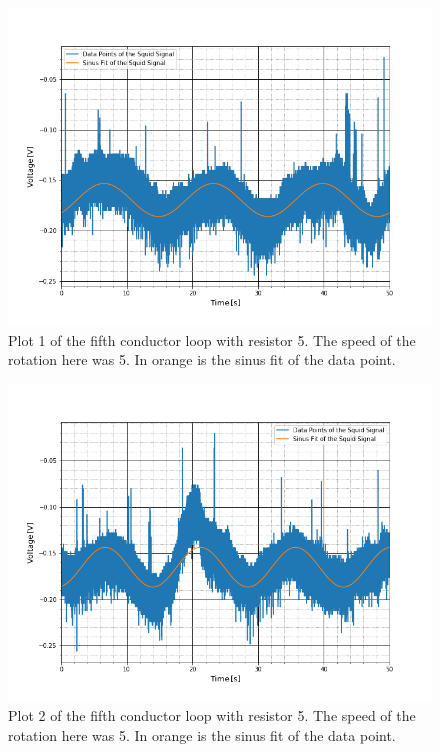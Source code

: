 \begin{figure}[ht]
	\includegraphics[scale=0.5]{Bild/r5_5_2}
	\centering
	\caption[Plot of fifth conductor loop 1]{Plot 1 of the fifth conductor loop with resistor 5. The speed of the rotation here was 5. In orange is the sinus fit of the data point.}
\end{figure}
\begin{figure}[ht]
	\includegraphics[scale=0.5]{Bild/r5_5_3}
	\centering
	\caption[Plot of fifth conductor loop 2]{Plot 2 of the fifth conductor loop with resistor 5. The speed of the rotation here was 5. In orange is the sinus fit of the data point.}
\end{figure}
